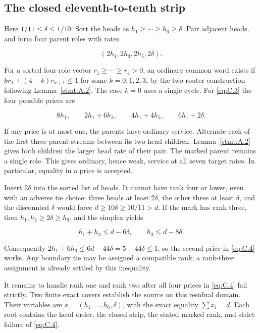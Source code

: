 \documentclass[11pt,a4paper]{article}
\begin{document}
\subsection{The closed eleventh-to-tenth strip}\label{sec:C.1}

Here \(1/11\le\delta\le1/10\). Sort the heads as \(h_1\ge\cdots\ge h_6\ge\delta\). Pair adjacent heads, and form four parent roles with rates

\begin{equation}
(2h_1,2h_3,2h_5,2\delta).
\tag{C.3}\label{eq:C.3}
\end{equation}

For a sorted four-role vector \(r_1\ge\cdots\ge r_4>0\), an ordinary common word exists if \(kr_1+(4-k)r_{k+1}\le1\) for some \(k=0,1,2,3\), by the two-router construction following Lemma~\ref{stmt:A.2}. The case \(k=0\) uses a single cycle. For \eqref{eq:C.3} the four possible prices are

\begin{equation}
8h_1,\qquad 2h_1+6h_3,\qquad 4h_1+4h_5,\qquad
 6h_1+2\delta.
\tag{C.4}\label{eq:C.4}
\end{equation}

If any price is at most one, the parents have ordinary service. Alternate each of the first three parent streams between its two head children. Lemma~\ref{stmt:A.2} gives both children the larger head rate of their pair. The marked parent remains a single role. This gives ordinary, hence weak, service at all seven target rates. In particular, equality in a price is accepted.

Insert \(2\delta\) into the sorted list of heads. It cannot have rank four or lower, even with an adverse tie choice: three heads at least \(2\delta\), the other three at least \(\delta\), and the discounted \(\delta\) would force \(d\ge10\delta\ge10/11>d\). If the mark has rank three, then \(h_1,h_2\ge2\delta\ge h_3\), and the simplex yields

\[
 h_1+h_3\le d-6\delta,\qquad h_3\le d-8\delta.
\]

Consequently \(2h_1+6h_3\le6d-44\delta=5-44\delta\le1\), so the second price in \eqref{eq:C.4} works. Any boundary tie may be assigned a compatible rank; a rank-three assignment is already settled by this inequality.

It remains to handle rank one and rank two after all four prices in \eqref{eq:C.4} fail strictly. Two finite exact covers establish the source on this residual domain. Their variables are \(x=(h_1,\ldots,h_6,\delta)\), with the exact equality \(\sum x_i=d\). Each root contains the head order, the closed strip, the stated marked rank, and strict failure of \eqref{eq:C.4}.
\end{document}
